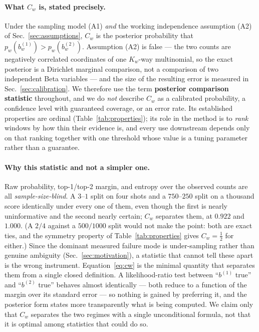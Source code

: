 \documentclass[final,5p,times,longtitle]{elsarticle}
\newcommand{\Cw}{C_w}
\begin{document}
\paragraph{What $\Cw$ is, stated precisely.} Under the sampling model
(A1) \emph{and} the working independence assumption (A2) of
Sec.~\ref{sec:assumptions}, $\Cw$ is the posterior probability that
$p_w(b^{(1)}_w) > p_w(b^{(2)}_w)$. Assumption (A2) is false --- the two
counts are negatively correlated coordinates of one $K_w$-way multinomial,
so the exact posterior is a Dirichlet marginal comparison, not a
comparison of two independent Beta variables --- and the size of the
resulting error is measured in Sec.~\ref{sec:calibration}. We therefore
use the term \textbf{posterior comparison statistic} throughout, and we
do \emph{not} describe $\Cw$ as a calibrated probability, a confidence
level with guaranteed coverage, or an error rate. Its established
properties are ordinal (Table~\ref{tab:properties}); its role in the
method is to \emph{rank}
windows by how thin their evidence is, and every use downstream depends
only on that ranking together with one threshold whose value is a tuning
parameter rather than a guarantee.

\paragraph{Why this statistic and not a simpler one.}
Raw probability, top-1/top-2 margin, and entropy over the observed counts
are all \emph{sample-size-blind}. A $3$--$1$ split on four shots and a
$750$--$250$ split on a thousand score identically under every one of them,
even though the first is nearly uninformative and the second nearly
certain; $\Cw$ separates them, at $0.922$ and $1.000$. (A $2/4$ against a
$500/1000$ split would not make the point: both are exact ties, and the
symmetry property of Table~\ref{tab:properties} gives $\Cw=\tfrac12$ for
either.) Since the dominant
measured failure mode is under-sampling rather than genuine ambiguity
(Sec.~\ref{sec:motivation}), a statistic that cannot tell these apart is
the wrong instrument. Equation~\eqref{eq:cw} is the minimal quantity that
separates them from a single closed definition. A likelihood-ratio test
between ``$b^{(1)}$ true'' and ``$b^{(2)}$ true'' behaves almost
identically --- both reduce to a function of the margin over its standard
error --- so nothing is gained by preferring it, and the posterior form
states more transparently what is being computed. We claim only that
$\Cw$ separates the two regimes with a single unconditional formula, not
that it is optimal among statistics that could do so.
\end{document}
